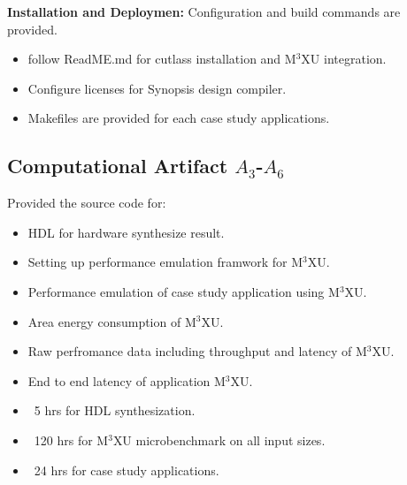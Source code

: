\documentclass[conference]{IEEEtran}
\newcommand{\MPCMXU}[1]{M$^{3}$XU}
\begin{document}
\noindent\textbf{Installation and Deploymen:} Configuration and build commands are provided.

\artcomp
\begin{itemize}
    \item follow ReadME.md for cutlass installation and \MPCMXU{} integration.
    \item Configure licenses for Synopsis design compiler.
    \item Makefiles are provided for each case study applications.
\end{itemize}

\subsection{Computational Artifact $A_3$-$A_6$}

\artrel
Provided the source code for:
\begin{itemize}
    \item HDL for hardware synthesize result.
    \item Setting up performance emulation framwork for \MPCMXU{}.
    \item Performance emulation of case study application using \MPCMXU{}.
\end{itemize}

\artexp
\begin{itemize}
    \item Area energy consumption of \MPCMXU{}.
    \item Raw perfromance data including throughput and latency of \MPCMXU{}.
    \item End to end latency of application \MPCMXU{}.
\end{itemize}


\arttime
\begin{itemize}
    \item ~5 hrs for HDL synthesization.
    \item ~120 hrs for \MPCMXU{} microbenchmark on all input sizes.
    \item ~24 hrs for case study applications.
\end{itemize}

\end{document}
